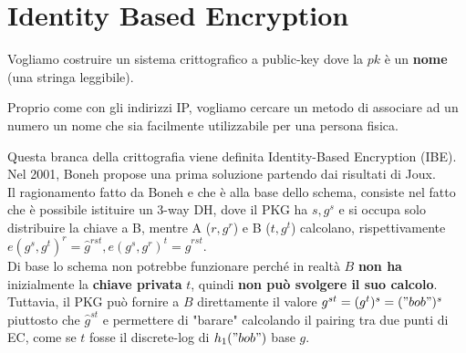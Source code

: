 \section{Identity Based Encryption}
\begin{problem}
Vogliamo costruire un sistema crittografico a public-key dove la $pk$ è un \textbf{nome} (una stringa leggibile).
\end{problem}
\begin{remark}
Proprio come con gli indirizzi IP, vogliamo cercare un metodo di associare ad un numero un nome che sia facilmente utilizzabile per una persona fisica.
\end{remark}
Questa branca della crittografia viene definita Identity-Based Encryption (IBE). Nel 2001, Boneh propose una prima soluzione partendo dai risultati di Joux.\\
Il ragionamento fatto da Boneh e che è alla base dello schema, consiste nel fatto che è possibile istituire un 3-way DH, dove il PKG ha $s,g^s$ e si occupa solo distribuire la chiave a B, mentre A ($r,g^r$) e B ($t,g^t$) calcolano, rispettivamente $e(g^s,g^t)^r=\hat{g}^{rst},e(g^s,g^r)^t=\hat{g}^{rst}$.\\
Di base lo schema non potrebbe funzionare perché in realtà $B$ \textbf{non ha} inizialmente la \textbf{chiave privata} $t$, quindi \textbf{non può svolgere il suo calcolo}. Tuttavia, il PKG può fornire a $B$ direttamente il valore $g^{st}=(g^t)^s=("bob")^s$ piuttosto che $\hat{g}^{st}$ e permettere di "barare" calcolando il pairing tra due punti di EC, come se $t$ fosse il discrete-log di $h_1("bob")$ base $g$.
